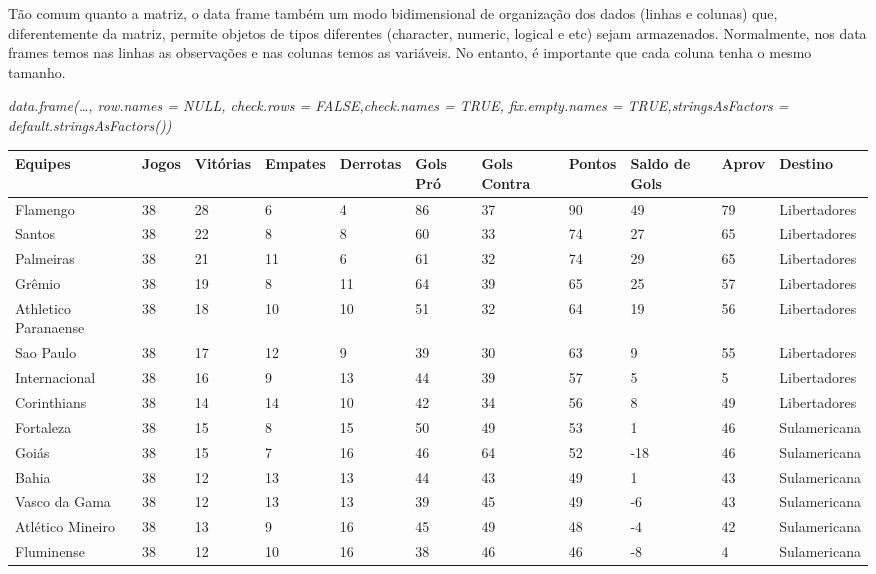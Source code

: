 \documentclass[
]{book}
\begin{document}
Tão comum quanto a matriz, o data frame também um modo bidimensional de organização dos dados (linhas e colunas) que, diferentemente da matriz, permite objetos de tipos diferentes (character, numeric, logical e etc) sejam armazenados.
Normalmente, nos data frames temos nas linhas as observações e nas colunas temos as variáveis.
No entanto, é importante que cada coluna tenha o mesmo tamanho.

\emph{\emph{data.frame(\ldots, row.names = NULL, check.rows = FALSE,check.names = TRUE, fix.empty.names = TRUE,stringsAsFactors = default.stringsAsFactors())}}

\begin{table}
\centering\begingroup\fontsize{11.5}{13.5}\selectfont

\begin{tabular}{l|l|l|l|l|l|l|l|l|l|l}
\hline
Equipes & Jogos & Vitórias & Empates & Derrotas & Gols Pró & Gols Contra & Pontos & Saldo de Gols & Aprov  & Destino\\
\hline
Flamengo & 38 & 28 & 6 & 4 & 86 & 37 & 90 & 49 & 79 & Libertadores\\
\hline
Santos & 38 & 22 & 8 & 8 & 60 & 33 & 74 & 27 & 65 & Libertadores\\
\hline
Palmeiras & 38 & 21 & 11 & 6 & 61 & 32 & 74 & 29 & 65 & Libertadores\\
\hline
Grêmio & 38 & 19 & 8 & 11 & 64 & 39 & 65 & 25 & 57 & Libertadores\\
\hline
Athletico Paranaense & 38 & 18 & 10 & 10 & 51 & 32 & 64 & 19 & 56 & Libertadores\\
\hline
Sao Paulo & 38 & 17 & 12 & 9 & 39 & 30 & 63 & 9 & 55 & Libertadores\\
\hline
Internacional & 38 & 16 & 9 & 13 & 44 & 39 & 57 & 5 & 5 & Libertadores\\
\hline
Corinthians & 38 & 14 & 14 & 10 & 42 & 34 & 56 & 8 & 49 & Libertadores\\
\hline
Fortaleza & 38 & 15 & 8 & 15 & 50 & 49 & 53 & 1 & 46 & Sulamericana\\
\hline
Goiás & 38 & 15 & 7 & 16 & 46 & 64 & 52 & -18 & 46 & Sulamericana\\
\hline
Bahia & 38 & 12 & 13 & 13 & 44 & 43 & 49 & 1 & 43 & Sulamericana\\
\hline
Vasco da Gama & 38 & 12 & 13 & 13 & 39 & 45 & 49 & -6 & 43 & Sulamericana\\
\hline
Atlético Mineiro & 38 & 13 & 9 & 16 & 45 & 49 & 48 & -4 & 42 & Sulamericana\\
\hline
Fluminense & 38 & 12 & 10 & 16 & 38 & 46 & 46 & -8 & 4 & Sulamericana\\

\end{tabular}
\end{table}
\end{document}
